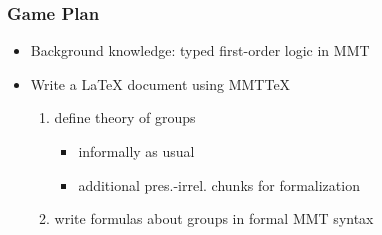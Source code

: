 \begin{frame}\frametitle{Game Plan}
\begin{itemize}
\item Background knowledge: typed first-order logic in MMT
\item Write a LaTeX document using MMTTeX
 \begin{enumerate}
  \item define theory of groups
  \begin{itemize}
   \item informally as usual
   \item additional pres.-irrel. chunks for formalization
  \end{itemize}
  \item write formulas about groups in formal MMT syntax
 \end{enumerate}
\end{itemize}
\end{frame}

